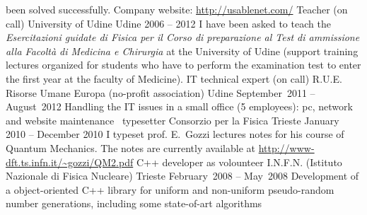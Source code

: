 \begin{cventries}
{been solved successfully.
Company website: \url{http://usablenet.com/}}
\cventry
{Teacher (on call)}
{University of Udine}
{Udine}
{2006 -- 2012}
{
   I have been asked to teach  the \emph{Esercitazioni guidate di Fisica per il Corso
      di preparazione al Test di ammissione alla Facolt\`a di Medicina e
      Chirurgia} at the University of Udine (support training lectures
   organized for students who have to perform the examination test to enter the
   first year at the faculty of Medicine).}
\cventry
{IT technical expert (on call)}
{R.U.E. Risorse Umane Europa (no-profit
   association)}
{Udine}
{September~2011 -- August~2012}
{
   Handling the IT issues in a small office (5 employees): pc, network and
   website maintenance}
\cventry
{\LaTeXe\ typesetter}
{Consorzio per la Fisica}
{Trieste}
{January 2010 -- December 2010}
{   I typeset prof. E.~Gozzi lectures notes for his course of Quantum Mechanics.
   The notes are currently available at 
   \url{http://www-dft.ts.infn.it/~gozzi/QM2.pdf}}
\cventry
{C++ developer as volounteer}
{I.N.F.N. (Istituto Nazionale di Fisica
   Nucleare)}
{Trieste}
{February~2008 -- May~2008}
{Development of a object-oriented C++ library for uniform and non-uniform
   pseudo-random number generations, including some state-of-art algorithms}

\end{cventries}
